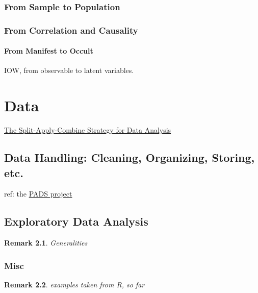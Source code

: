 \documentclass[reqno,12pt]{tufte-book}
\numberwithin{equation}{subsection}
\newtheorem{remark}{Remark}
\begin{document}
\section{From Sample to Population}

\section{From Correlation and Causality}

\subsection{From Manifest to Occult}

IOW, from observable to latent variables.

\part{Data}

\href{http://www.jstatsoft.org/v40/i01}{The Split-Apply-Combine Strategy for Data Analysis}

\chapter{Data Handling: Cleaning, Organizing, Storing, etc.}

ref:  the \href{http://www.padsproj.org/index.html}{PADS project}

\chapter{Exploratory Data Analysis}
\label{chap:eda}

\begin{remark}
  Generalities
\end{remark}

\section{Misc}

\begin{remark}
  examples taken from R, so far
\end{remark}
\end{document}
